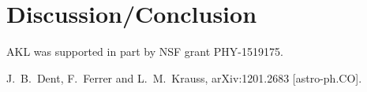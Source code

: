\documentclass[nofootinbib,aps,prd,preprint,superscriptaddress]{revtex4}
\begin{document}
\section{Discussion/Conclusion}	
	
\acknowledgments

AKL was supported in part by NSF grant PHY-1519175.


\begin{thebibliography}{99}

  J.~B.~Dent, F.~Ferrer and L.~M.~Krauss,
  arXiv:1201.2683 [astro-ph.CO].


\end{thebibliography}
\end{document}
